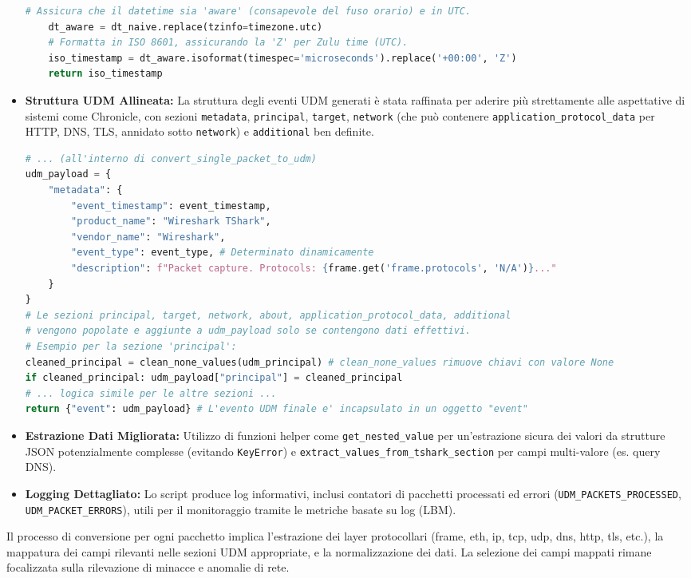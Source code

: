\documentclass[11pt, a4paper]{article}
\begin{document}
\begin{itemize}
\begin{lstlisting}[language=Python, caption={Estratto da \texttt{json2udm\_cloud.py}: Funzione \texttt{convert\_timestamp\_robust}.}, label=lst:convert_timestamp, basicstyle=\ttfamily\scriptsize]
    # Assicura che il datetime sia 'aware' (consapevole del fuso orario) e in UTC.
    dt_aware = dt_naive.replace(tzinfo=timezone.utc)
    # Formatta in ISO 8601, assicurando la 'Z' per Zulu time (UTC).
    iso_timestamp = dt_aware.isoformat(timespec='microseconds').replace('+00:00', 'Z')
    return iso_timestamp
    \end{lstlisting} 

    \item \textbf{Struttura UDM Allineata:} La struttura degli eventi UDM generati è stata raffinata per aderire più strettamente alle aspettative di sistemi come Chronicle, con sezioni \texttt{metadata}, \texttt{principal}, \texttt{target}, \texttt{network} (che può contenere \texttt{application\_protocol\_data} per HTTP, DNS, TLS, annidato sotto \texttt{network}) e \texttt{additional} ben definite.
    
    \begin{lstlisting}[language=Python, caption={Estratto da \texttt{json2udm\_cloud.py}: Struttura di un evento UDM.}, label=lst:udm_structure, basicstyle=\ttfamily\scriptsize]
# ... (all'interno di convert_single_packet_to_udm)
udm_payload = {
    "metadata": {
        "event_timestamp": event_timestamp,
        "product_name": "Wireshark TShark",
        "vendor_name": "Wireshark",
        "event_type": event_type, # Determinato dinamicamente
        "description": f"Packet capture. Protocols: {frame.get('frame.protocols', 'N/A')}..."
    }
}
# Le sezioni principal, target, network, about, application_protocol_data, additional
# vengono popolate e aggiunte a udm_payload solo se contengono dati effettivi.
# Esempio per la sezione 'principal':
cleaned_principal = clean_none_values(udm_principal) # clean_none_values rimuove chiavi con valore None
if cleaned_principal: udm_payload["principal"] = cleaned_principal
# ... logica simile per le altre sezioni ...
return {"event": udm_payload} # L'evento UDM finale e' incapsulato in un oggetto "event"
    \end{lstlisting} 

    \item \textbf{Estrazione Dati Migliorata:} Utilizzo di funzioni helper come \texttt{get\_nested\_value} per un'estrazione sicura dei valori da strutture JSON potenzialmente complesse (evitando \texttt{KeyError}) e \texttt{extract\_values\_from\_tshark\_section} per campi multi-valore (es. query DNS).
    \item \textbf{Logging Dettagliato:} Lo script produce log informativi, inclusi contatori di pacchetti processati ed errori (\texttt{UDM\_PACKETS\_PROCESSED}, \texttt{UDM\_PACKET\_ERRORS}), utili per il monitoraggio tramite le metriche basate su log (LBM).
\end{itemize}
Il processo di conversione per ogni pacchetto implica l'estrazione dei layer protocollari (frame, eth, ip, tcp, udp, dns, http, tls, etc.), la mappatura dei campi rilevanti nelle sezioni UDM appropriate, e la normalizzazione dei dati. La selezione dei campi mappati rimane focalizzata sulla rilevazione di minacce e anomalie di rete.
\end{document}
